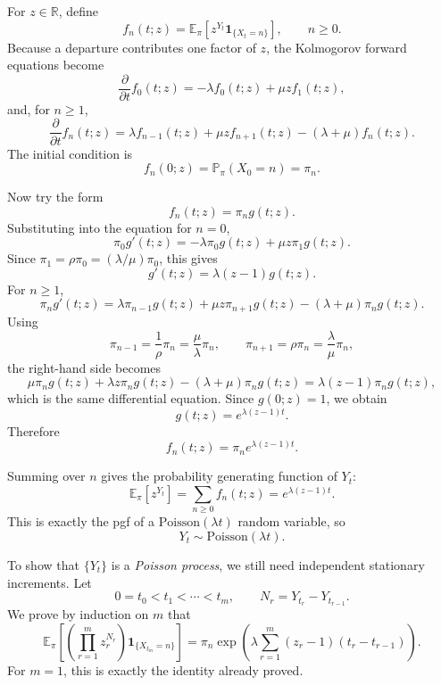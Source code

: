 \documentclass[11pt]{article}
\newcommand{\E}{\mathbb{E}}
\newcommand{\PP}{\mathbb{P}}
\newcommand{\1}{\mathbf{1}}
\begin{document}
For \(z \in \mathbb{R}\), define
\[
    f_n(t;z) = \E_\pi\!\left[z^{Y_t}\1_{\{X_t=n\}}\right], \qquad n \ge 0.
\]
Because a departure contributes one factor of \(z\), the Kolmogorov forward equations become
\[
    \frac{\partial}{\partial t} f_0(t;z) = -\lambda f_0(t;z) + \mu z f_1(t;z),
\]
and, for \(n \ge 1\),
\[
    \frac{\partial}{\partial t} f_n(t;z)
    = \lambda f_{n-1}(t;z) + \mu z f_{n+1}(t;z) - (\lambda+\mu)f_n(t;z).
\]
The initial condition is
\[
    f_n(0;z) = \PP_\pi(X_0=n) = \pi_n.
\]

Now try the form
\[
    f_n(t;z) = \pi_n g(t;z).
\]
Substituting into the equation for \(n=0\),
\[
    \pi_0 g'(t;z)
    = -\lambda \pi_0 g(t;z) + \mu z \pi_1 g(t;z).
\]
Since \(\pi_1 = \rho \pi_0 = (\lambda/\mu)\pi_0\), this gives
\[
    g'(t;z) = \lambda(z-1)g(t;z).
\]
For \(n \ge 1\),
\[
    \pi_n g'(t;z)
    = \lambda \pi_{n-1}g(t;z) + \mu z \pi_{n+1}g(t;z) - (\lambda+\mu)\pi_n g(t;z).
\]
Using
\[
    \pi_{n-1} = \frac{1}{\rho}\pi_n = \frac{\mu}{\lambda}\pi_n,
    \qquad
    \pi_{n+1} = \rho \pi_n = \frac{\lambda}{\mu}\pi_n,
\]
the right-hand side becomes
\[
    \mu \pi_n g(t;z) + \lambda z \pi_n g(t;z) - (\lambda+\mu)\pi_n g(t;z)
    = \lambda(z-1)\pi_n g(t;z),
\]
which is the same differential equation. Since \(g(0;z)=1\), we obtain
\[
    g(t;z)=e^{\lambda(z-1)t}.
\]
Therefore
\[
    f_n(t;z)=\pi_n e^{\lambda(z-1)t}.
\]

Summing over \(n\) gives the probability generating function of \(Y_t\):
\[
    \E_\pi[z^{Y_t}] = \sum_{n \ge 0} f_n(t;z) = e^{\lambda(z-1)t}.
\]
This is exactly the pgf of a \(\mathrm{Poisson}(\lambda t)\) random variable, so
\[
    Y_t \sim \mathrm{Poisson}(\lambda t).
\]

To show that \(\{Y_t\}\) is a \emph{Poisson process}, we still need independent stationary increments. Let
\[
    0=t_0<t_1<\cdots<t_m,
    \qquad
    N_r = Y_{t_r}-Y_{t_{r-1}}.
\]
We prove by induction on \(m\) that
\[
    \E_\pi\!\left[\left(\prod_{r=1}^m z_r^{N_r}\right)\1_{\{X_{t_m}=n\}}\right]
    =
    \pi_n
    \exp\!\left(\lambda\sum_{r=1}^m (z_r-1)(t_r-t_{r-1})\right).
    \tag{*}
\]
For \(m=1\), this is exactly the identity already proved.
\end{document}
